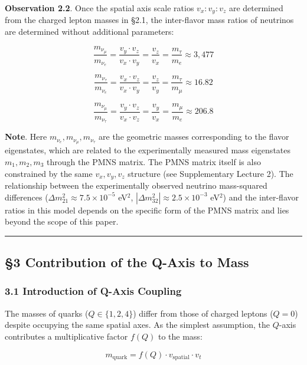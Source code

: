 \documentclass[
  a4paper,11pt]{article}
\theoremstyle{definition}
\theoremstyle{remark}
\begin{document}
\textbf{Observation 2.2}. Once the spatial axis scale ratios
\(v_x : v_y : v_z\) are determined from the charged lepton masses in
§2.1, the inter-flavor mass ratios of neutrinos are determined without
additional parameters:

\[\frac{m_{\nu_\mu}}{m_{\nu_e}} = \frac{v_y \cdot v_z}{v_x \cdot v_y} = \frac{v_z}{v_x} = \frac{m_\tau}{m_e} \approx 3{,}477\]

\[\frac{m_{\nu_\tau}}{m_{\nu_e}} = \frac{v_x \cdot v_z}{v_x \cdot v_y} = \frac{v_z}{v_y} = \frac{m_\tau}{m_\mu} \approx 16.82\]

\[\frac{m_{\nu_\mu}}{m_{\nu_\tau}} = \frac{v_y \cdot v_z}{v_x \cdot v_z} = \frac{v_y}{v_x} = \frac{m_\mu}{m_e} \approx 206.8\]

\textbf{Note}. Here \(m_{\nu_e}, m_{\nu_\mu}, m_{\nu_\tau}\) are the
geometric masses corresponding to the flavor eigenstates, which are
related to the experimentally measured mass eigenstates
\(m_1, m_2, m_3\) through the PMNS matrix. The PMNS matrix itself is
also constrained by the same \(v_x, v_y, v_z\) structure (see
Supplementary Lecture 2). The relationship between the experimentally
observed neutrino mass-squared differences
(\(\Delta m^2_{21} \approx 7.5 \times 10^{-5}\) eV\(^2\),
\(|\Delta m^2_{32}| \approx 2.5 \times 10^{-3}\) eV\(^2\)) and the
inter-flavor ratios in this model depends on the specific form of the
PMNS matrix and lies beyond the scope of this paper.

\begin{center}\rule{0.5\linewidth}{0.5pt}\end{center}

\subsection{§3 Contribution of the Q-Axis to
Mass}\label{contribution-of-the-q-axis-to-mass}

\subsubsection{3.1 Introduction of Q-Axis
Coupling}\label{introduction-of-q-axis-coupling}

The masses of quarks (\(Q \in \{1, 2, 4\}\)) differ from those of
charged leptons (\(Q = 0\)) despite occupying the same spatial axes. As
the simplest assumption, the \(Q\)-axis contributes a multiplicative
factor \(f(Q)\) to the mass:

\[m_{\text{quark}} = f(Q) \cdot v_{\text{spatial}} \cdot v_t\]
\end{document}

